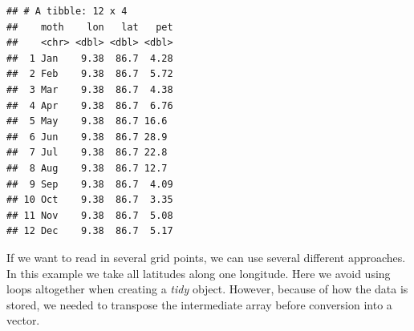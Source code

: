 \documentclass[krantz2,ChapterTOCs]{krantz}\usepackage{knitr}
\begin{document}
\begin{knitrout}\footnotesize
{}\color{fgcolor}\begin{kframe}
\begin{alltt}
 \hlkwb{<-}
    \hlstd{(} \hlstd{= month.abb[}\hlopt{:}\hlstd{],}
            \hlstd{= longitude[}\hlstd{],}
            \hlstd{= latitude[}\hlstd{],}
            \hlstd{=}  \hlstd{)[}\hlstd{,} \hlstd{, ]}
           \hlstd{)}
\end{alltt}
\begin{verbatim}
## # A tibble: 12 x 4
##    moth    lon   lat   pet
##    <chr> <dbl> <dbl> <dbl>
##  1 Jan    9.38  86.7  4.28
##  2 Feb    9.38  86.7  5.72
##  3 Mar    9.38  86.7  4.38
##  4 Apr    9.38  86.7  6.76
##  5 May    9.38  86.7 16.6 
##  6 Jun    9.38  86.7 28.9 
##  7 Jul    9.38  86.7 22.8 
##  8 Aug    9.38  86.7 12.7 
##  9 Sep    9.38  86.7  4.09
## 10 Oct    9.38  86.7  3.35
## 11 Nov    9.38  86.7  5.08
## 12 Dec    9.38  86.7  5.17
\end{verbatim}
\end{kframe}
\end{knitrout}

If we want to read in several grid points, we can use several different approaches. In this example we take all latitudes along one longitude. Here we avoid using loops altogether when creating a \emph{tidy}  object. However, because of how the data is stored, we needed to transpose the intermediate array before conversion into a vector.
\end{document}
